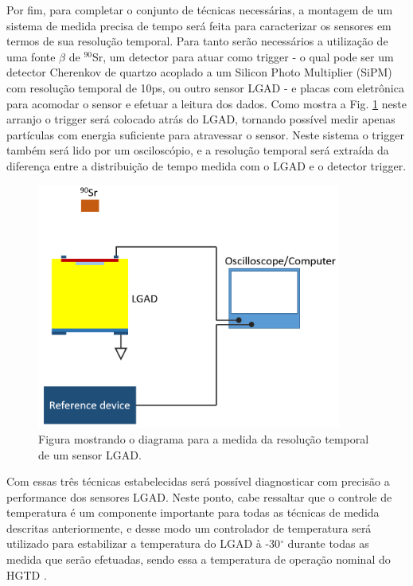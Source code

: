 Por fim, para completar o conjunto de técnicas necessárias, a montagem de um sistema de medida precisa de tempo será feita para caracterizar os sensores em termos de sua resolução temporal. Para tanto serão necessários a utilização de uma fonte $\beta$ de $^{90}$Sr, um detector para atuar como trigger - o qual pode ser um detector Cherenkov de quartzo acoplado a um Silicon Photo Multiplier (SiPM) com resolução temporal de 10ps, ou outro sensor LGAD - e placas com eletrônica para acomodar o sensor e efetuar a leitura dos dados. Como mostra a Fig. \ref{setup2} neste arranjo o trigger será colocado atrás do LGAD, tornando possível medir apenas partículas com energia suficiente para atravessar o sensor. Neste sistema o trigger também será lido por um osciloscópio, e a resolução temporal será extraída da diferença entre a distribuição de tempo medida com o LGAD e o detector trigger.

\begin{figure}
    \centering
    \includegraphics[width=10.0cm]{assets/time.png}
    \caption{Figura mostrando o diagrama para a medida da resolução temporal de um sensor LGAD.}
    \label{setup2}
\end{figure}

Com essas três técnicas estabelecidas será possível diagnosticar com precisão a performance dos sensores LGAD. Neste ponto, cabe ressaltar que o controle de temperatura é um componente importante para todas as técnicas de medida descritas anteriormente, e desse modo um controlador de temperatura será utilizado para estabilizar a temperatura do LGAD à -30$^{\circ}$ durante todas as medida que serão efetuadas, sendo essa a temperatura de operação nominal do HGTD \cite{tdr}.

